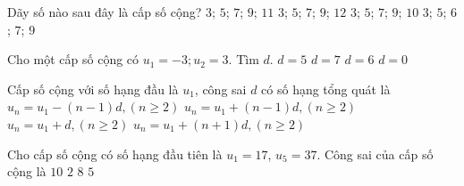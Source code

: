 

\begin{ex}%
	Dãy số nào sau đây  là cấp số cộng?
	 \choice
		{\True $3$; $5$;  $7$; $9$; $11$}
		{$3$; $5$; $7$; $9$; $12$} 
		 {$3$; $5$; $7$; $9$; $10$}
		{$3$; $5$;  $6$; $7$; $9$}
\end{ex}

\begin{ex}%
	Cho  một cấp số cộng có $u_1=-3;u_2=3$. Tìm $d$.
	 \choice
		 {$d=5$}
		{$d=7$} 
		{\True $d=6$} 
		{$d=0$} 
\end{ex}

\begin{ex}%
	Cấp số cộng với số hạng đầu là $u_1$, công sai $d$ có  số hạng tổng quát là
	 \choice
		{$u_n  = u_1 - (n-1)d, (n\geq 2)$}
		{\True $u_n =  u_1 + (n-1)d, (n\geq 2)$}
		{$u_n = u_1 + d, (n\geq 2)$} 
		{$u_n = u_1 + (n+1)d, (n\geq  2)$}
\end{ex}

\begin{ex}%
	Cho cấp số cộng có số hạng đầu tiên là $u_1 = 17$,  $u_5 = 37$. Công sai của cấp số cộng là
	 \choice
		{$10$} 
		 {$2$}
		{$8$} 
		{\True  $5$}
\end{ex}

